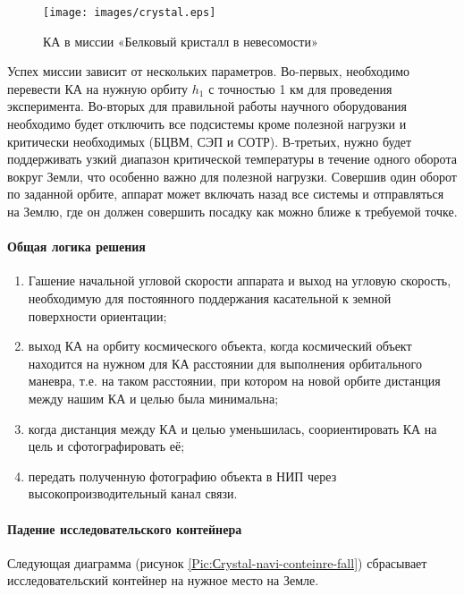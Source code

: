 \documentclass[12pt,a4paper]{article}
\begin{document}
\begin{figure}[tbh]
  \begin{center}
    \texttt{[image: images/crystal.eps]}
    \caption{КА в миссии «Белковый кристалл в невесомости»}
    \label{Pic:Crystal}
  \end{center}
\end{figure}

Успех миссии зависит от нескольких параметров. Во-первых, необходимо перевести КА на нужную орбиту $h_1$ с точностью 1 км для проведения эксперимента. Во-вторых для правильной работы научного оборудования необходимо будет отключить все подсистемы кроме полезной нагрузки и критически необходимых (БЦВМ, СЭП и СОТР). В-третьих, нужно будет поддерживать узкий диапазон критической температуры в течение одного оборота вокруг Земли, что особенно важно для полезной нагрузки. Совершив один оборот по заданной орбите, аппарат может включать назад все системы и отправляться на Землю, где он должен совершить посадку как можно ближе к требуемой точке.

\clearpage
\paragraph{Общая логика решения} 

\begin{enumerate}
\item Гашение начальной угловой скорости аппарата и выход на угловую скорость, необходимую для постоянного поддержания касательной к земной поверхности ориентации;
\item выход КА на орбиту космического объекта, когда космический объект находится на нужном для КА расстоянии для выполнения орбитального маневра, т.е. на таком расстоянии, при котором на новой орбите дистанция между нашим КА и целью была минимальна;
\item когда дистанция между КА и целью уменьшилась, соориентировать КА на цель и сфотографировать её;
\item передать полученную фотографию объекта в НИП через высокопроизводительный канал связи.
\end{enumerate}

\paragraph{Падение исследовательского контейнера} Следующая диаграмма (рисунок \ref{Pic:Сrystal-navi-conteinre-fall}) сбрасывает исследовательский контейнер на нужное место на Земле.
\end{document}
